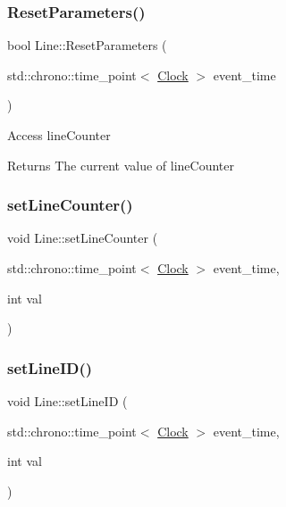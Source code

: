 \mbox{\label{classLine_af1756d1500ab0a5616313be6e213015a}} 
\subsubsection{\texorpdfstring{Reset\+Parameters()}{ResetParameters()}}
{\footnotesize\ttfamily bool Line\+::\+Reset\+Parameters (\begin{DoxyParamCaption}\item[{std\+::chrono\+::time\+\_\+point$<$ \mbox{\hyperlink{universe_8h_a0ef8d951d1ca5ab3cfaf7ab4c7a6fd80}{Clock}} $>$}]{event\+\_\+time }\end{DoxyParamCaption})}

Access line\+Counter \begin{DoxyReturn}{Returns}
The current value of line\+Counter 
\end{DoxyReturn}
\mbox{\label{classLine_ab98abcf3c8546e266ae5bbea243d8b8d}} 
\subsubsection{\texorpdfstring{set\+Line\+Counter()}{setLineCounter()}}
{\footnotesize\ttfamily void Line\+::set\+Line\+Counter (\begin{DoxyParamCaption}\item[{std\+::chrono\+::time\+\_\+point$<$ \mbox{\hyperlink{universe_8h_a0ef8d951d1ca5ab3cfaf7ab4c7a6fd80}{Clock}} $>$}]{event\+\_\+time,  }\item[{int}]{val }\end{DoxyParamCaption})\hspace{0.3cm}{\ttfamily [inline]}}

\mbox{\label{classLine_aaa634bf320b9d1c4becb4083cd8324d4}} 
\subsubsection{\texorpdfstring{set\+Line\+I\+D()}{setLineID()}}
{\footnotesize\ttfamily void Line\+::set\+Line\+ID (\begin{DoxyParamCaption}\item[{std\+::chrono\+::time\+\_\+point$<$ \mbox{\hyperlink{universe_8h_a0ef8d951d1ca5ab3cfaf7ab4c7a6fd80}{Clock}} $>$}]{event\+\_\+time,  }\item[{int}]{val }\end{DoxyParamCaption})\hspace{0.3cm}{\ttfamily [inline]}}

